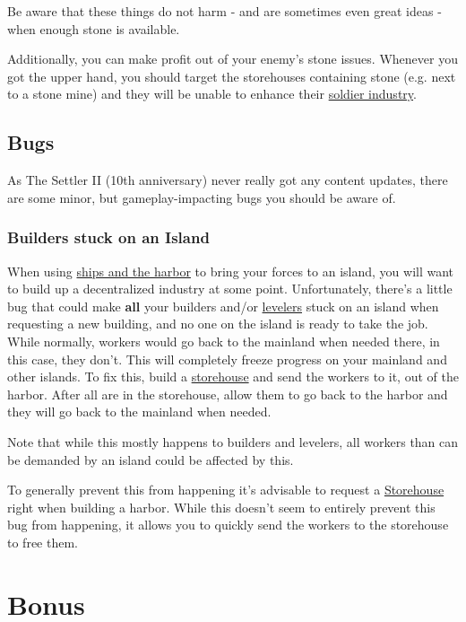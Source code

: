 \documentclass[12pt]{article}
\begin{document}
Be aware that these things do not harm - and are sometimes even great ideas - when enough stone is available.

Additionally, you can make profit out of your enemy's stone issues. Whenever you got the upper hand, you should target the storehouses containing stone (e.g. next to a stone mine) and they will be unable to enhance their \hyperref[sec:soldiers]{soldier industry}.

\subsection{Bugs}
\label{sec:bugs}

As The Settler II (10th anniversary) never really got any content updates, there are some minor, but gameplay-impacting bugs you should be aware of.

\subsubsection{Builders stuck on an Island}
\label{sec:buildersstuckonisland}

When using \hyperref[sec:shipsandharbor]{ships and the harbor} to bring your forces to an island, you will want to build up a decentralized industry at some point. Unfortunately, there's a little bug that could make \textbf{all} your builders and/or \hyperref[sec:leveler]{levelers} stuck on an island when requesting a new building, and no one on the island is ready to take the job. While normally, workers would go back to the mainland when needed there, in this case, they don't. This will completely freeze progress on your mainland and other islands. To fix this, build a \hyperref[sec:storehouse]{storehouse} and send the workers to it, out of the harbor. After all are in the storehouse, allow them to go back to the harbor and they will go back to the mainland when needed.

Note that while this mostly happens to builders and levelers, all workers than can be demanded by an island could be affected by this.

To generally prevent this from happening it's advisable to request a \hyperref[sec:storehouse]{Storehouse} right when building a harbor. While this doesn't seem to entirely prevent this bug from happening, it allows you to quickly send the workers to the storehouse to free them.

\section{Bonus}
\label{sec:bonus}
\end{document}
